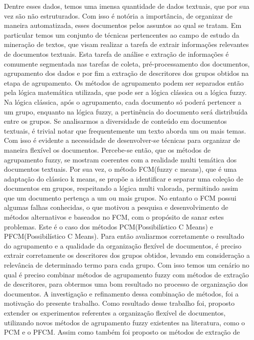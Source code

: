 Dentre esses dados, temos uma imensa quantidade de dados textuais, que por sua vez são não
estruturados. Com isso é notória a importância, de organizar de maneira automatizada, esses
documentos pelos assuntos ao qual se tratam. Em particular temos um conjunto de técnicas
pertencentes ao campo de estudo da mineração de textos, que visam realizar a tarefa de extrair
informações relevantes de documentos textuais. Esta tarefa de análise e extração de informações é
comumente segmentada nas tarefas de coleta, pré-processamento dos documentos, agrupamento dos dados
e por fim a extração de descritores dos grupos obtidos na etapa de agrupamento. Os métodos de
agrupamento podem ser separados então pela lógica matemática utilizada, que pode ser a lógica
clássica ou a lógica fuzzy. Na lógica clássica, após o agrupamento, cada documento só poderá
pertencer a um grupo, enquanto na lógica fuzzy, a pertinência do documento será distribuída entre os
grupos.  Se analisarmos a diversidade de conteúdo em documentos textuais, é trivial notar que
frequentemente um texto aborda um ou mais temas. Com isso é evidente a necessidade de desenvolver-se
técnicas para organizar de maneira flexível os documentos. Percebe-se então, que os métodos de
agrupamento fuzzy, se mostram coerentes com a realidade multi temática dos documentos textuais. Por
sua vez, o método FCM(fuzzy c means), que é uma adaptação do clássico k means, se propõe a
identificar e separar uma coleção de documentos em grupos, respeitando a lógica multi valorada,
permitindo assim que um documento pertença a um ou mais grupos. No entanto o FCM possui algumas
falhas conhecidas, o que motivou a pesquisa e desenvolvimento de métodos alternativos e baseados no
FCM, com o propósito de sanar estes problemas.  Este é o caso dos métodos PCM(Possibilístico C
Means) e PFCM(Possibilístico C Means).  Para então avaliarmos corretamente o resultado do
agrupamento e a qualidade da organização flexível de documentos, é preciso extrair corretamente os
descritores dos grupos obtidos, levando em consideração a relevância de determinado termo para cada
grupo. Com isso temos um cenário no qual é preciso combinar métodos de agrupamento fuzzy com métodos
de extração de descritores, para obtermos uma bom resultado no processo de organização dos
documentos. A investigação e refinamento dessa combinação de métodos, foi a motivação do presente
trabalho. Como resultado desse trabalho foi, proposto extender os experimentos referentes a
organização flexível de documentos, utilizando novos métodos de agrupamento fuzzy existentes na
literatura, como o PCM e o PFCM. Assim como também foi proposto os métodos de extração de
